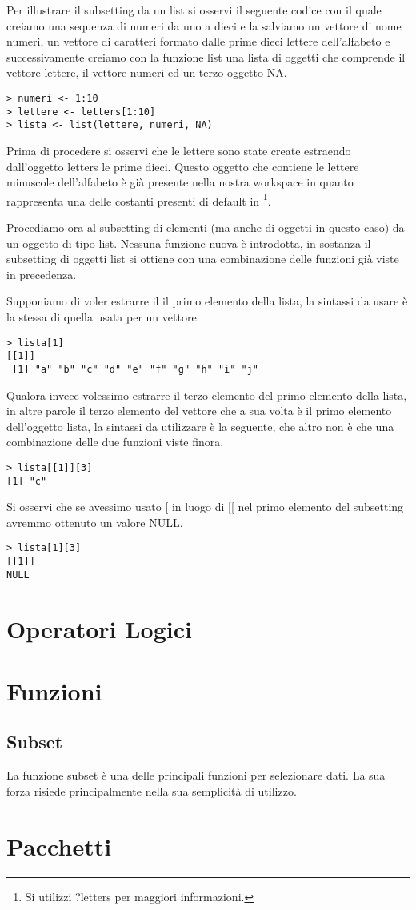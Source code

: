 Per illustrare il subsetting da un list si osservi il seguente codice con il quale creiamo una sequenza di numeri da uno a dieci e la salviamo un vettore di nome \textsf{numeri}, un vettore di caratteri formato dalle prime dieci lettere dell'alfabeto e successivamente creiamo con la funzione \textsf{list} una lista di oggetti che comprende il vettore lettere, il vettore numeri ed un terzo oggetto NA.

\begin{lstlisting}
> numeri <- 1:10
> lettere <- letters[1:10]
> lista <- list(lettere, numeri, NA)
\end{lstlisting}

Prima di procedere si osservi che le lettere sono state create estraendo dall'oggetto \textsf{letters} le prime dieci. Questo oggetto che contiene le lettere minuscole dell'alfabeto è già presente nella nostra workspace in quanto rappresenta una delle costanti presenti di default in \erre\footnote{Si utilizzi ?letters per maggiori informazioni.}.

Procediamo ora al subsetting di elementi (ma anche di oggetti in questo caso) da un oggetto di tipo list. Nessuna funzione nuova è introdotta, in sostanza il subsetting di oggetti list si ottiene con una combinazione delle funzioni già viste in precedenza.

Supponiamo di voler estrarre il il primo elemento della lista, la sintassi da usare è la stessa di quella usata per un vettore.
\begin{lstlisting}
> lista[1]
[[1]]
 [1] "a" "b" "c" "d" "e" "f" "g" "h" "i" "j"
\end{lstlisting}
 
Qualora invece volessimo estrarre il terzo elemento del primo elemento della lista, in altre parole il terzo elemento del vettore che a sua volta è il primo elemento dell'oggetto lista, la sintassi da utilizzare è la seguente, che altro non è che una combinazione delle due funzioni viste finora.
\begin{lstlisting}
> lista[[1]][3]
[1] "c"
\end{lstlisting}

Si osservi che se avessimo usato \textsf{[} in luogo di \textsf{[[} nel primo elemento del subsetting avremmo ottenuto un valore NULL.
\begin{lstlisting}
> lista[1][3]
[[1]]
NULL
\end{lstlisting}
\section{Operatori Logici}

\section{Funzioni}
\subsection{Subset}

La funzione subset è una delle principali funzioni per selezionare dati. La sua forza risiede principalmente nella sua semplicità di utilizzo.

\section{Pacchetti}
